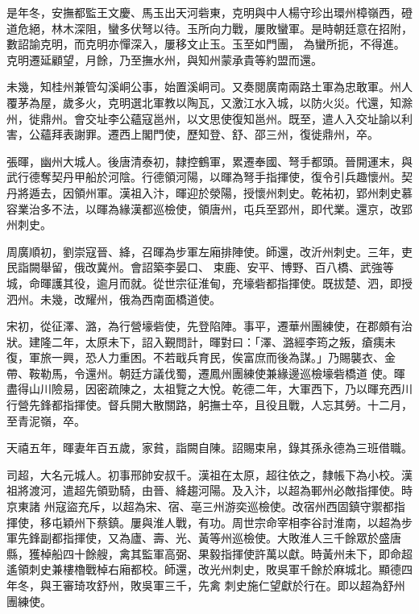 \begin{pinyinscope}
 是年冬，安撫都監王文慶、馬玉出天河砦東，克明與中人楊守珍出環州樟嶺西，磴道危絕，林木深阻，蠻多伏弩以待。玉所向力戰，屢敗蠻軍。是時朝廷意在招附，數詔諭克明，而克明亦憚深入，屢移文止玉。玉至如門團，
 為蠻所扼，不得進。克明遷延顧望，月餘，乃至撫水州，與知州蒙承貴等約盟而還。



 未幾，知桂州兼管勾溪峒公事，始置溪峒司。又奏閱廣南兩路土軍為忠敢軍。州人覆茅為屋，歲多火，克明選北軍教以陶瓦，又激江水入城，以防火災。代還，知滁州，徙鼎州。會交址李公蘊寇邕州，以文思使復知邕州。既至，遣人入交址諭以利害，公蘊拜表謝罪。遷西上閣門使，歷知登、舒、邵三州，復徙鼎州，卒。



 張暉，幽州大城人。後唐清泰初，隸控鶴軍，累遷奉國、弩手都頭。晉開運末，與武行德奪契丹甲船於河陰。行德領河陽，以暉為弩手指揮使，復令引兵趣懷州。契丹將遁去，因領州軍。漢祖入汴，暉迎於滎陽，授懷州刺史。乾祐初，郢州刺史慕容業治多不法，以暉為緣漢都巡檢使，領唐州，屯兵至郢州，即代業。還京，改郢州刺史。



 周廣順初，劉崇寇晉、絳，召暉為步軍左廂排陣使。師還，改沂州刺史。三年，吏民詣闕舉留，俄改冀州。會詔築李晏口、
 束鹿、安平、博野、百八橋、武強等城，命暉護其役，逾月而就。從世宗征淮甸，充壕砦都指揮使。既拔楚、泗，即授泗州。未幾，改耀州，俄為西南面橋道使。



 宋初，從征澤、潞，為行營壕砦使，先登陷陣。事平，遷華州團練使，在郡頗有治狀。建隆二年，太原未下，詔入覲問計，暉對曰：「澤、潞經李筠之叛，瘡痍未復，軍旅一興，恐人力重困。不若戢兵育民，俟富庶而後為謀。」乃賜襲衣、金帶、鞍勒馬，令還州。朝廷方議伐蜀，遷鳳州團練使兼緣邊巡檢壕砦橋道
 使。暉盡得山川險易，因密疏陳之，太祖覽之大悅。乾德二年，大軍西下，乃以暉充西川行營先鋒都指揮使。督兵開大散關路，躬撫士卒，且役且戰，人忘其勞。十二月，至青泥嶺，卒。



 天禧五年，暉妻年百五歲，家貧，詣闕自陳。詔賜束帛，錄其孫永德為三班借職。



 司超，大名元城人。初事邢帥安叔千。漢祖在太原，超往依之，隸帳下為小校。漢祖將渡河，遣超先領勁騎，由晉、絳趨河陽。及入汴，以超為鄆州必敵指揮使。時京東諸
 州寇盜充斥，以超為宋、宿、亳三州游奕巡檢使。改宿州西固鎮守禦都指揮使，移屯穎州下蔡鎮。屢與淮人戰，有功。周世宗命宰相李谷討淮南，以超為步軍先鋒副都指揮使，又為廬、壽、光、黃等州巡檢使。大敗淮人三千餘眾於盛唐縣，獲棹船四十餘艘，禽其監軍高弼、果毅指揮使許萬以獻。時黃州未下，即命超遙領刺史兼樓櫓戰棹右廂都校。師還，改光州刺史，敗吳軍千餘於麻城北。顯德四年冬，與王審琦攻舒州，敗吳軍三千，先禽
 刺史施仁望獻於行在。即以超為舒州團練使。




\end{pinyinscope}
